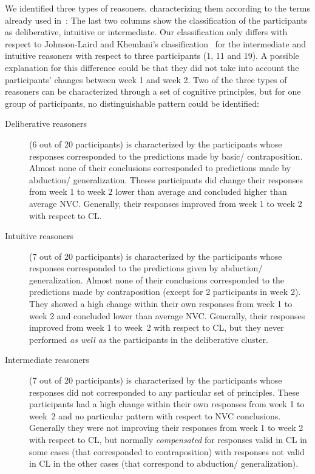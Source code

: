 \documentclass[12pt]{article}
\begin{document}
We identified three types of reasoners, characterizing them according to the terms already used in~\cite{khemlani:2016}: 
The last two columns show the classification of the participants as deliberative, intuitive or intermediate. 
Our classification only differs with respect to Johnson-Laird and Khemlani's 
classification~\cite{khemlani:2016} for the intermediate and intuitive reasoners with respect to three participants (1, 11 and 19).
A possible explanation for this difference could be that they
did not take into account the participants' changes between week 1 and week 2.
Two of the three types of reasoners can be characterized through a set of cognitive principles, but for one
group of participants, no distinguishable pattern could be identified:
\begin{description}
 \item[Deliberative reasoners] (6 out of 20 participants) is characterized by the participants whose responses corresponded to the predictions made by basic/ contraposition. Almost none of their conclusions corresponded to predictions made by abduction/ generalization. Theses participants did change their responses from week 1 to week 2 
 lower than average and concluded higher than average NVC. Generally, their responses improved from week 1 to week 2 with respect to CL.
 \item[Intuitive reasoners] (7 out of 20 participants)
is characterized by the participants whose responses corresponded to the predictions given by abduction/ generalization. Almost none of their conclusions corresponded to the predictions made by contraposition (except for 2 participants in week 2). They showed a high change within their own responses from week 1 to week 2 
 and concluded lower than average NVC. Generally, their responses improved from week 1 to week~2 with respect to CL, but they never performed \textit{as well as} the participants in 
 the deliberative cluster.
 \item[Intermediate reasoners] (7 out of 20 participants) is characterized by the participants whose responses did not corresponded to any particular set of principles. These participants had a high change within their own responses from week 1 to week~2
 and no particular pattern with respect to NVC conclusions. Generally they were not improving their responses from week 1 to week 2 with respect to CL, but normally \textit{compensated} for responses valid in CL in some cases (that corresponded to contraposition) with responses not valid in CL in the other cases (that correspond to abduction/ generalization).
\end{description}
\end{document}

